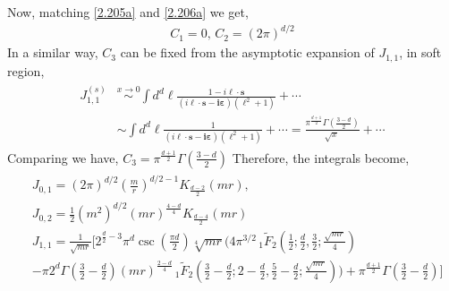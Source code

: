 Now, matching \eqref{2.205a} and \eqref{2.206a} we get,
\begin{align}
    C_1=0,\,C_2=(2\pi)^{d/2}
\end{align}
In a similar way, $C_3$ can be fixed from the asymptotic expansion of  $J_{1,1}$, in soft region,
\begin{align}
\begin{split}
    J_{1,1}^{(s)}&\overset{x\to0}{\sim} \int d^d\ell \frac{1-i\boldsymbol{\ell}\cdot \boldsymbol{s}}{(i\boldsymbol{\ell\cdot s-i\varepsilon})(\boldsymbol{\ell}^2+1)}+\cdots\\ &
    \sim \int d^d\ell \frac{1}{(i\boldsymbol{\ell\cdot s-i\varepsilon})(\boldsymbol{\ell}^2+1)}+\cdots=\frac{\pi^{\frac{d+1}{2}}\Gamma\left(\frac{3-d}{2}\right)}{\sqrt{x}\,}+\cdots
    \end{split}
\end{align}
Comparing we have, $C_3={\pi^{\frac{d+1}{2}}}\Gamma\left(\frac{3-d}{2}\right)$
Therefore, the integrals become,
\begin{align}
\begin{split}
 &   J_{0,1}=(2\pi)^{d/2} \left(\frac{m}{r}\right)^{d/2-1}K_{\frac{d-2}{2}}(mr),\\ &
    J_{0,2}=\frac{1}{2}(m^2)^{d/2}\left(mr\right)^{\frac{4-d}{4}} K_{\frac{d-4}{2}}(mr)\\ &
    J_{1,1}=\frac{1}{\sqrt{m r}}\Bigg[2^{\frac{d}{2}-3} \pi ^d \csc \left(\frac{\pi  d}{2}\right) \sqrt[4]{m r} \Big(4 \pi ^{3/2} \, _1\tilde{F}_2\left(\frac{1}{2};\frac{d}{2},\frac{3}{2};\frac{\sqrt{m r}}{4}\right)\\ &-\pi  2^d \Gamma \left(\frac{3}{2}-\frac{d}{2}\right) (m r)^{\frac{2-d}{4}} \, _1\tilde{F}_2\left(\frac{3}{2}-\frac{d}{2};2-\frac{d}{2},\frac{5}{2}-\frac{d}{2};\frac{\sqrt{m r}}{4}\right)\Big)+\pi ^{\frac{d+1}{2}} \Gamma \left(\frac{3}{2}-\frac{d}{2}\right)\Bigg]
    \end{split}
\end{align}
